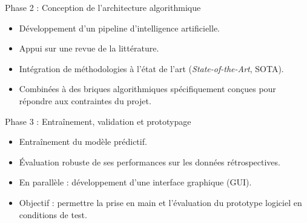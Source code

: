 \documentclass{beamer}
\begin{document}
\begin{frame}{Phase 2 : Conception de l'architecture algorithmique}
  \begin{itemize}
    \item Développement d'un pipeline d'intelligence artificielle.
    \item Appui sur une revue de la littérature.
    \item Intégration de méthodologies à l'état de l'art (\textit{State-of-the-Art}, SOTA).
    \item Combinées à des briques algorithmiques spécifiquement conçues pour répondre aux contraintes du projet.
  \end{itemize}
\end{frame}

\begin{frame}{Phase 3 : Entraînement, validation et prototypage}
  \begin{itemize}
    \item Entraînement du modèle prédictif.
    \item Évaluation robuste de ses performances sur les données rétrospectives.
    \item En parallèle : développement d'une interface graphique (GUI).
    \item Objectif : permettre la prise en main et l'évaluation du prototype logiciel en conditions de test.
  \end{itemize}
\end{frame}
\end{document}
